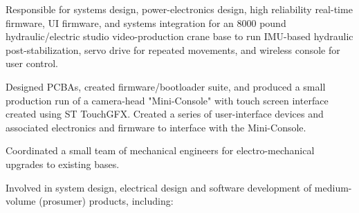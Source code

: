 \documentclass[letterpaper]{deedy-resume} %
\begin{document}
\begin{minipage}[t]{0.66\textwidth} %


\sectionspace %


\begin{tightitemize}

\item
Responsible for systems design, power-electronics design, high reliability real-time firmware, UI firmware, and systems integration for an 8000 pound hydraulic/electric studio video-production crane base to run IMU-based hydraulic post-stabilization, servo drive for repeated movements, and wireless console for user control.

\item 
Designed PCBAs, created firmware/bootloader suite, and produced a small production run of a camera-head "Mini-Console" with touch screen interface created using ST TouchGFX.  Created a series of user-interface devices and associated electronics and firmware to interface with the Mini-Console.

\item Coordinated a small team of mechanical engineers for electro-mechanical upgrades to existing bases.

\end{tightitemize}
\vspace{\topsep} %

\begin{tightitemize}
\item 
Involved in system design, electrical design and software development of medium-volume (prosumer) products, including:


\end{tightitemize}
\end{minipage}
\end{document}
